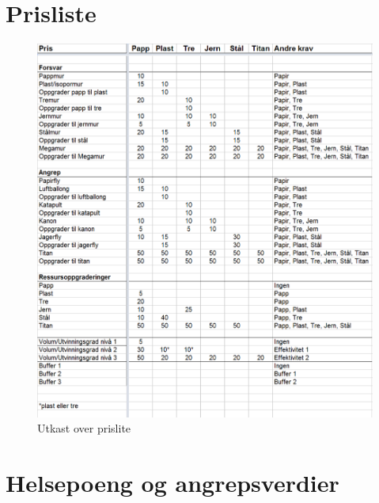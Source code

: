 \appendix {} \pagestyle{plain}
\section{Prisliste} \label{A}

			\begin{figure} [H]
				\begin{center}
				\includegraphics[width=155mm]{images/prisliste_stor}
				\caption{Utkast over prislite}
				\end{center}
			\end{figure}

\section{Helsepoeng og angrepsverdier} \label{B}

